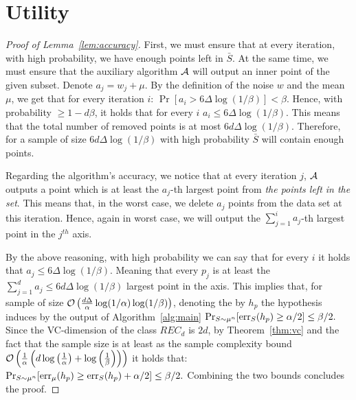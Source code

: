 \documentclass[12pt,a4paper,oneside,onecolumn]{book}
\begin{document}
\section{Utility}
\label{sec:accuracy}

\begin{proof}[Proof of Lemma~\ref{lem:accuracy}]
  First, we must ensure that at every iteration, with high probability,
  we have enough points left in $\bar{S}$.
  At the same time, we must ensure
  that the auxiliary algorithm $\IP$ will output an inner point of the given subset.
  Denote $a_j = w_j + \mu$.
  By the definition of the noise $w$ and the mean $\mu$,
  we get that for every iteration $i$: \quad
  $
    \Pr[a_i > 6 \Delta \log(1/\beta)] < \beta
  $.
  Hence, with probability $\geq 1- d\beta$, it holds that for every $i$
  $a_i \leq 6 \Delta \log(1/\beta)$.
  This means that the total number of removed points is at most
  $6d\Delta \log(1/\beta)$.
  Therefore, for a sample of size $6d\Delta \log(1/\beta)$
  with high probability $\bar{S}$ will contain enough points.

  Regarding the algorithm's accuracy, we notice that
  at every  iteration $j$, $\IP$ outputs a point
  which is at least the $a_j$-th largest point from
  \emph{the points left in the set}.
  This means that, in the worst case,
  we delete $a_j$ points from the data set at this iteration.
  Hence, again in worst case, we will output the $\sum_{j=1}^{i} a_j$-th largest point
  in the $j^{th}$ axis.

  By the above reasoning, 
  with high probability we can say that for every $i$ it holds that
  $a_j \leq 6 \Delta \log(1/\beta)$.
  Meaning that  every $p_j$ is at least the
  $\sum_{j=1}^d a_j \leq 6 d \Delta \log(1/\beta)$
  largest point in the axis.
  This implies that, 
  for sample of size
  $\bigO{\frac{d \Delta}{\alpha} \log(1/\alpha)\log(1/\beta)}$,
  denoting the by $h_p$ the hypothesis induces by the output of Algorithm~\ref{alg:main} 
  $
    \Pr_{S\sim \measure^n}[\errS{h_p}{S} \geq \alpha/2] \leq \beta/2.
  $
  Since the VC-dimension of the class $REC_d$ is $2d$, by Theorem~\ref{thm:vc} and the fact that the sample size is at least as the sample complexity bound
  $\bigO{\frac{1}{\alpha}\left(d\log\left(\frac{1}{\alpha}\right) + \log\left(\frac{1}{\beta}\right)\right)}$
  it holds that: \quad
  $
    \Pr_{S\sim \measure^n}[\errD{h_p} \geq \errS{h_p}{S} + \alpha/2] \leq \beta/2.
  $
  Combining the two bounds concludes the proof.
\end{proof}
\end{document}
